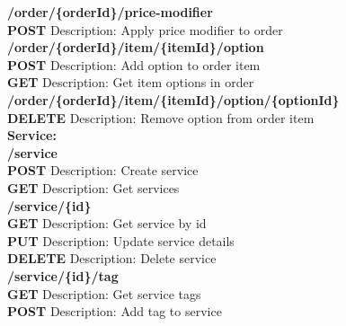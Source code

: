 \documentclass[11pt,a4paper,pdftex]{article}
\begin{document}
\hspace*{1em}\textbf{/order/\{\textbf{orderId}\}/price-modifier}\\
\hspace*{2em}\textbf{POST} Description: Apply price modifier to order\\

\hspace*{1em}\textbf{/order/\{\textbf{orderId}\}/item/\{\textbf{itemId}\}/option}\\
\hspace*{2em}\textbf{POST} Description: Add option to order item\\
\hspace*{2em}\textbf{GET} Description: Get item options in order\\

\hspace*{1em}\textbf{/order/\{\textbf{orderId}\}/item/\{\textbf{itemId}\}/option/\{\textbf{optionId}\}}\\
\hspace*{2em}\textbf{DELETE} Description: Remove option from order item\\


\textbf{Service:}\\
\hspace*{1em}\textbf{/service}\\
\hspace*{2em}\textbf{POST} Description: Create service\\
\hspace*{2em}\textbf{GET} Description: Get services\\

\hspace*{1em}\textbf{/service/\{\textbf{id}\}}\\
\hspace*{2em}\textbf{GET} Description: Get service by id\\
\hspace*{2em}\textbf{PUT} Description: Update service details\\
\hspace*{2em}\textbf{DELETE} Description: Delete service\\

\hspace*{1em}\textbf{/service/\{\textbf{id}\}/tag}\\
\hspace*{2em}\textbf{GET} Description: Get service tags\\
\hspace*{2em}\textbf{POST} Description: Add tag to service\\
\end{document}
